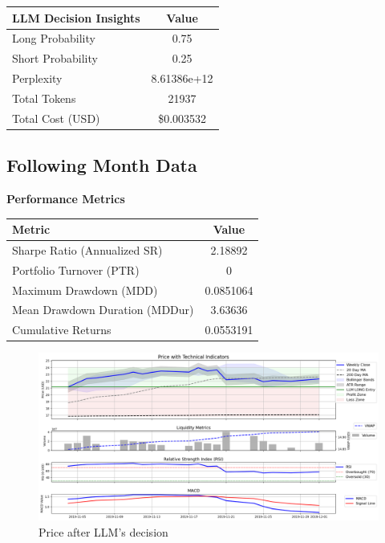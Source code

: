 \documentclass[8pt]{scrartcl}
\begin{document}
\begin{longtable}{l c}
\toprule
\textbf{LLM Decision Insights} & \textbf{Value} \\
\midrule
Long Probability & 0.75 \\
Short Probability & 0.25 \\
Perplexity & 8.61386e+12 \\
\midrule
Total Tokens & 21937 \\
Total Cost (USD) & \$0.003532 \\
\bottomrule
\end{longtable}

\subsection*{Following Month Data}

\textbf{Performance Metrics}

\begin{longtable}{l c}
\toprule
\textbf{Metric} & \textbf{Value} \\
\midrule
Sharpe Ratio (Annualized SR) & 2.18892 \\
Portfolio Turnover (PTR) & 0 \\
Maximum Drawdown (MDD) & 0.0851064 \\
Mean Drawdown Duration (MDDur) & 3.63636 \\
Cumulative Returns & 0.0553191 \\
\bottomrule
\end{longtable}

\begin{figure}[H]
    \centering
    \includegraphics[width=1\linewidth]{judge_reviews//TSLA_M_gpt-4o-mini//2019-11-01/llm_Price_with_Technical_Indicators.png}
    \caption{Price after LLM's decision}
\end{figure}
\end{document}
